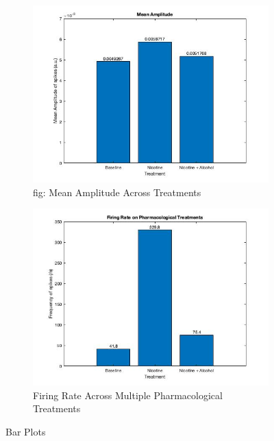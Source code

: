 \documentclass{article}
\begin{document}
\begin{figure}[h!]
  \centering
  \begin{subfigure}{0.45\linewidth}
    \includegraphics[width=\linewidth]{pharma-mean.jpg}
    \caption{fig: Mean Amplitude Across Treatments}
  \end{subfigure}
  \begin{subfigure}{0.45\linewidth}
    \includegraphics[width=\linewidth]{pharma-firing.jpg}
    \caption{Firing Rate Across Multiple Pharmacological Treatments}
  \end{subfigure}
  \caption{Bar Plots}
  \label{fig:pharma}
\end{figure}

\newpage
\end{document}
